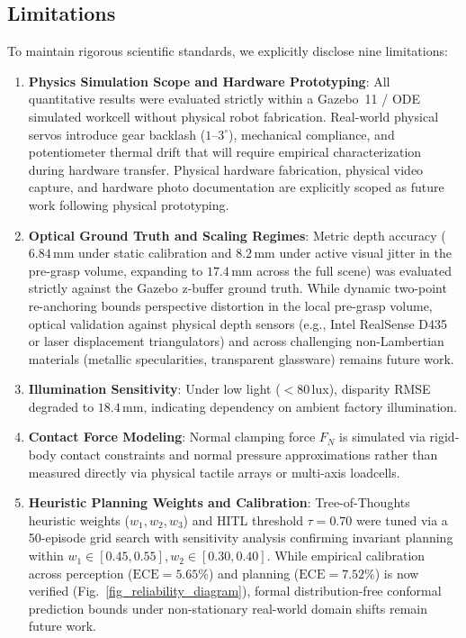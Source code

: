 \documentclass[journal]{IEEEtran}
\begin{document}
\subsection{Limitations}
To maintain rigorous scientific standards, we explicitly disclose nine limitations:
\begin{enumerate}
    \item \textbf{Physics Simulation Scope and Hardware Prototyping}: All quantitative results were evaluated strictly within a Gazebo~11 / ODE simulated workcell without physical robot fabrication. Real-world physical servos introduce gear backlash ($1\text{--}3^\circ$), mechanical compliance, and potentiometer thermal drift that will require empirical characterization during hardware transfer. Physical hardware fabrication, physical video capture, and hardware photo documentation are explicitly scoped as future work following physical prototyping.
    \item \textbf{Optical Ground Truth and Scaling Regimes}: Metric depth accuracy ($6.84$\,mm under static calibration and $8.2$\,mm under active visual jitter in the pre-grasp volume, expanding to $17.4$\,mm across the full scene) was evaluated strictly against the Gazebo z-buffer ground truth. While dynamic two-point re-anchoring bounds perspective distortion in the local pre-grasp volume, optical validation against physical depth sensors (e.g., Intel RealSense D435 or laser displacement triangulators) and across challenging non-Lambertian materials (metallic specularities, transparent glassware) remains future work.
    \item \textbf{Illumination Sensitivity}: Under low light ($<80$\,lux), disparity RMSE degraded to $18.4$\,mm, indicating dependency on ambient factory illumination.
    \item \textbf{Contact Force Modeling}: Normal clamping force $F_N$ is simulated via rigid-body contact constraints and normal pressure approximations rather than measured directly via physical tactile arrays or multi-axis loadcells.
    \item \textbf{Heuristic Planning Weights and Calibration}: Tree-of-Thoughts heuristic weights ($w_1, w_2, w_3$) and HITL threshold $\tau = 0.70$ were tuned via a 50-episode grid search with sensitivity analysis confirming invariant planning within $w_1 \in [0.45, 0.55], w_2 \in [0.30, 0.40]$. While empirical calibration across perception ($\text{ECE} = 5.65\%$) and planning ($\text{ECE} = 7.52\%$) is now verified (Fig.~\ref{fig_reliability_diagram}), formal distribution-free conformal prediction bounds under non-stationary real-world domain shifts remain future work.

\end{enumerate}
\end{document}
